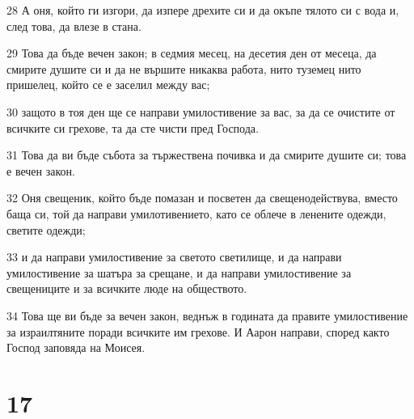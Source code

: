 \par 28 А оня, който ги изгори, да изпере дрехите си и да окъпе тялото си с вода и, след това, да влезе в стана.
\par 29 Това да бъде вечен закон; в седмия месец, на десетия ден от месеца, да смирите душите си и да не вършите никаква работа, нито туземец нито пришелец, който се е заселил между вас;
\par 30 защото в тоя ден ще се направи умилостивение за вас, за да се очистите от всичките си грехове, та да сте чисти пред Господа.
\par 31 Това да ви бъде събота за тържествена почивка и да смирите душите си; това е вечен закон.
\par 32 Оня свещеник, който бъде помазан и посветен да свещенодействува, вместо баща си, той да направи умилотивението, като се облече в ленените одежди, светите одежди;
\par 33 и да направи умилостивение за светото светилище, и да направи умилостивение за шатъра за срещане, и да направи умилостивение за свещениците и за всичките люде на обществото.
\par 34 Това ще ви бъде за вечен закон, веднъж в годината да правите умилостивение за израилтяните поради всичките им грехове. И Аарон направи, според както Господ заповяда на Моисея.

\chapter{17}

